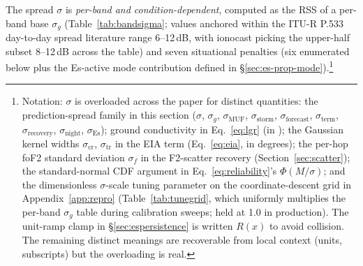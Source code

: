 \documentclass[11pt,a4paper]{article}
\newcommand{\si}[1]{\text{#1}}
\begin{document}
The spread $\sigma$ is \emph{per-band and condition-dependent},
computed as the RSS of a per-band base $\sigma_g$
(Table~\ref{tab:bandsigma}; values anchored within the ITU-R
P.533 day-to-day spread literature range 6--12\,dB, with
ionocast picking the upper-half subset 8--12\,dB across the
table) and seven situational penalties
(six enumerated below plus the Es-active mode contribution
defined in \S\ref{sec:es-prop-mode}).\footnote{Notation: $\sigma$ is overloaded across the
paper for distinct quantities: the prediction-spread family in
this section ($\sigma$, $\sigma_g$, $\sigma_{\text{MUF}}$,
$\sigma_{\text{storm}}$, $\sigma_{\text{forecast}}$,
$\sigma_{\text{term}}$, $\sigma_{\text{recovery}}$,
$\sigma_{\text{night}}$, $\sigma_{\text{Es}}$); ground
conductivity in Eq.~\ref{eq:lgr} (in \si{S/m}); the Gaussian
kernel widths $\sigma_{\text{cr}}$, $\sigma_{\text{tr}}$ in the
EIA term (Eq.~\ref{eq:eia}, in degrees); the per-hop foF2
standard deviation $\sigma_{\!f}$ in the F2-scatter recovery
(Section~\ref{sec:scatter}); the standard-normal CDF argument
in Eq.~\ref{eq:reliability}'s $\Phi(M/\sigma)$; and the
dimensionless $\sigma$-scale tuning parameter on the
coordinate-descent grid in Appendix~\ref{app:repro}
(Table~\ref{tab:tunegrid}, which uniformly multiplies the
per-band $\sigma_g$ table during calibration sweeps; held at
1.0 in production).  The unit-ramp clamp in
\S\ref{sec:espersistence} is written $R(x)$
to avoid collision.  The remaining distinct meanings are
recoverable from local context (units, subscripts) but the
overloading is real.}
\end{document}
